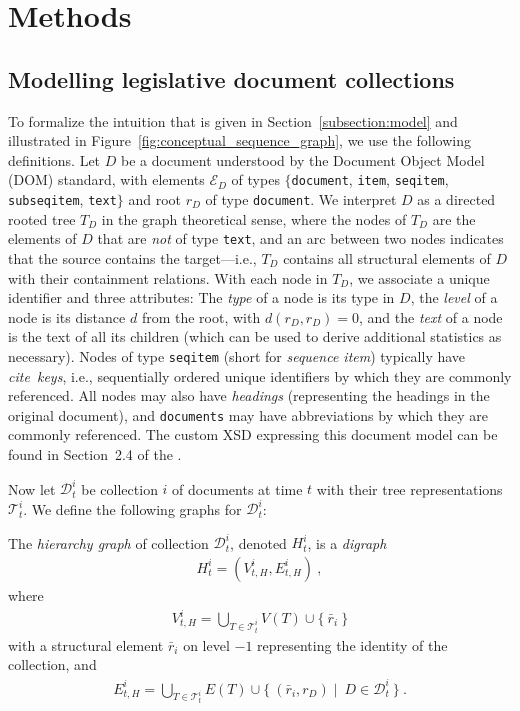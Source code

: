 \section{Methods}
\label{section:methods}

\subsection{Modelling legislative document collections}\label{subsection:methods:modelling}

To formalize the intuition that is given in Section~\ref{subsection:model} and illustrated in Figure~\ref{fig:conceptual_sequence_graph}, 
we use the following definitions.
Let $D$ be a document understood by the Document Object Model (DOM) standard, 
with elements $\mathcal{E}_D$ of types $\{$\texttt{document}, \texttt{item}, \texttt{seqitem}, \texttt{subseqitem}, \texttt{text}$\}$ and root $r_D$ of type \texttt{document}.
We interpret $D$ as a directed rooted tree $T_D$ in the graph theoretical sense,
where the nodes of $T_D$ are the elements of $D$ that are \emph{not} of type \texttt{text}, 
and an arc between two nodes indicates that the source contains the target---i.e., $T_D$ contains all structural elements of $D$ with their containment relations.
With each node in $T_D$, we associate a unique identifier and three attributes: 
The \emph{type} of a node is its type in $D$, 
the \emph{level} of a node is its distance $d$ from the root, with $d(r_D,r_D) = 0$, and the \emph{text} of a node is the text of all its children (which can be used to derive additional statistics as necessary). 
Nodes of type \texttt{seqitem} (short for \emph{sequence item}) typically have \emph{cite~keys}, i.e., sequentially ordered unique identifiers by which they are commonly referenced. 
All nodes may also have \emph{headings} (representing the headings in the original document), and \texttt{documents} may have abbreviations by which they are commonly referenced.
The custom XSD expressing this document model can be found in Section~2.4 of the \suppi.

Now let $\mathcal{D}^i_t$ be collection $i$ of documents at time $t$ with their tree representations $\mathcal{T}^i_t$.
We define the following graphs for $\mathcal{D}^i_t$:

\begin{definition}
	The \emph{hierarchy graph} of collection $\mathcal{D}^i_t$, denoted $H^i_t$, is a \emph{digraph}
	\begin{align*}
	H^i_t = (V^i_{t,H}, E^i_{t,H})~,
	\end{align*} 
	where 
	\begin{align*}
	V^i_{t,H} = \underset{T\in\mathcal{T}^i_t}{\bigcup} V(T) \cup \{~\bar{r}_i~\}
	\end{align*}
	with a structural element $\bar{r}_i$ on level $-1$ representing the identity of the collection, 
	and
	\begin{align*}
	E^i_{t,H} = \underset{T\in\mathcal{T}^i_t}{\bigcup} E(T) \cup \{~(\bar{r}_i,r_D)\mid~D\in\mathcal{D}^i_t~\}~.
	\end{align*}	
\end{definition}

